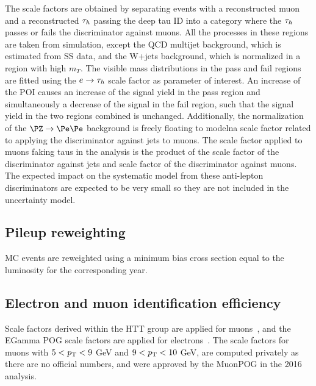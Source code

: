 The scale factors are obtained by separating events with a reconstructed muon and a reconstructed $\tau_h$ passing
the deep tau ID into a category where the $\tau_h$ passes or fails the discriminator against muons. All the processes in
these regions are taken from simulation, except the QCD multijet background, which is estimated from SS data, and the W+jets background, which is normalized in a region with high $m_T$. The visible mass distributions in the pass and fail regions are fitted using the $e\to\tau_h$ scale factor as parameter of interest. An increase of the POI causes an increase of the signal yield in the pass region and simultaneously a decrease of the signal in the fail region, such that the signal yield in the two regions combined is unchanged. Additionally, the normalization of the $\PZ\to\Pe\Pe$ background is freely floating to modelna scale
factor related to applying the discriminator against jets to muons. The scale factor applied to muons faking taus in the 
analysis is the product of the scale factor of the discriminator against jets and scale factor of the discriminator against muons.
The expected impact on the systematic model from these anti-lepton discriminators are expected to be very small so they are not included in the uncertainty model.




\subsection{Pileup reweighting}

MC events are reweighted using a minimum bias cross section equal to the luminosity for the corresponding year.

\subsection{Electron and muon identification efficiency}

Scale factors derived within the HTT group are applied for muons~\cite{AN16355}, and the EGamma POG scale factors are applied for electrons~\cite{EGammaMVAID}. The scale factors for muons with $5<p_{\mathrm{T}}<9$ GeV and $9<p_{\mathrm{T}}<10$ GeV, are computed privately as there are no official numbers, and were approved by the MuonPOG in the 2016 analysis. 
  
